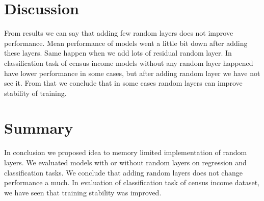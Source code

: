 \documentclass[]{article}
\begin{document}
\begin{multicols}{2}
	\section{Discussion}
	From results we can say that adding few random layers does not improve performance. Mean performance of models went a little bit down after adding these layers. Same happen when we add lots of residual random layer. In classification task of census income models without any random layer happened have lower performance in some cases, but after adding random layer we have not see it. From that we conclude that in some cases random layers can improve stability of training.
	
	\section{Summary}
	In conclusion we proposed idea to memory limited implementation of random layers. We evaluated models with or without random layers on regression and classification tasks. We conclude that adding random layers does not change performance a much. In evaluation of classification task of census income dataset, we have seen that training stability was improved.
	
	
	
\end{multicols}
\end{document}
